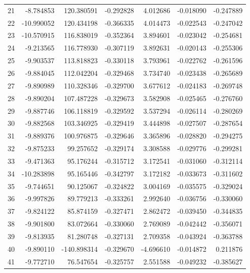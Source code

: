 \begin{tabular}{rrrrrrr}
 21 &  -8.784853 &  120.380591 & -0.292828 &   4.012686 &  -0.018090 & -0.247889 \\
 22 & -10.990052 &  120.434198 & -0.366335 &   4.014473 &  -0.022543 & -0.247042 \\
 23 & -10.570915 &  116.838019 & -0.352364 &   3.894601 &  -0.023042 & -0.254681 \\
 24 &  -9.213565 &  116.778930 & -0.307119 &   3.892631 &  -0.020143 & -0.255306 \\
 25 &  -9.903537 &  113.818823 & -0.330118 &   3.793961 &  -0.022762 & -0.261596 \\
 26 &  -9.884045 &  112.042204 & -0.329468 &   3.734740 &  -0.023438 & -0.265689 \\
 27 &  -9.890989 &  110.328346 & -0.329700 &   3.677612 &  -0.024183 & -0.269748 \\
 28 &  -9.890204 &  107.487228 & -0.329673 &   3.582908 &  -0.025465 & -0.276760 \\
 29 &  -9.887746 &  106.118819 & -0.329592 &   3.537294 &  -0.026114 & -0.280269 \\
 30 &  -9.882568 &  103.346925 & -0.329419 &   3.444898 &  -0.027507 & -0.287654 \\
 31 &  -9.889376 &  100.976875 & -0.329646 &   3.365896 &  -0.028820 & -0.294275 \\
 32 &  -9.875233 &   99.257652 & -0.329174 &   3.308588 &  -0.029776 & -0.299281 \\
 33 &  -9.471363 &   95.176244 & -0.315712 &   3.172541 &  -0.031060 & -0.312114 \\
 34 & -10.283898 &   95.165446 & -0.342797 &   3.172182 &  -0.033673 & -0.311602 \\
 35 &  -9.744651 &   90.125067 & -0.324822 &   3.004169 &  -0.035575 & -0.329024 \\
 36 &  -9.997826 &   89.779213 & -0.333261 &   2.992640 &  -0.036756 & -0.330060 \\
 37 &  -9.824122 &   85.874159 & -0.327471 &   2.862472 &  -0.039450 & -0.344835 \\
 38 &  -9.901800 &   83.072664 & -0.330060 &   2.769089 &  -0.042442 & -0.356071 \\
 39 &  -9.813935 &   81.280748 & -0.327131 &   2.709358 &  -0.043924 & -0.363788 \\
 40 &  -9.890110 & -140.898314 & -0.329670 &  -4.696610 &  -0.014872 &  0.211876 \\
 41 &  -9.772710 &   76.547654 & -0.325757 &   2.551588 &  -0.049232 & -0.385627 \\

\end{tabular}
